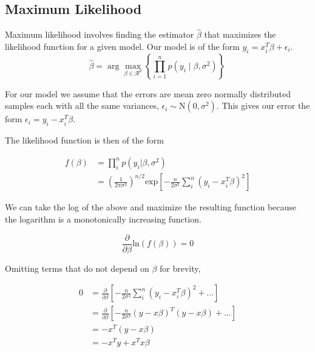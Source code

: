 \documentclass[12pt]{article}
\begin{document}
        \subsection*{Maximum Likelihood}

        Maximum likelihood involves finding the estimator $\hat{\beta}$ that maximizes the likelihood function for a given model. Our model is of the form $y_i = x_i^T \beta + \epsilon_i$.
        \begin{equation}
            \hat{\beta} = \arg \max_{\beta \in \mathcal{R}^p} \left\{ \prod_{i=1}^n p(y_i \mid \beta, \sigma^2) \right\} \,
        \end{equation}

        For our model we assume that the errors are mean zero normally distributed samples each with all the same variances, $\epsilon_i \sim \text{N}(0, \sigma^2)$. This gives our error the form $\epsilon_i = y_i - x_i^T \beta$. 

        The likelihood function is then of the form

        \begin{align}
            f(\beta) &= \prod_i^n p(y_i|\beta, \sigma^2) \\
             &= \left( \frac{1}{2 \pi \sigma^2}\right)^{n/2} \text{exp}\left [ -\frac{n}{2\sigma^2} \sum_i^n(y_i - x_i^T \beta)^2 \right]
        \end{align}

        We can take the log of the above and maximize the resulting function because the logarithm is a monotonically increasing function. 

        \begin{equation}
            \frac{\partial}{\partial \beta}\text{ln}(f(\beta)) = 0
        \end{equation}

        Omitting terms that do not depend on $\beta$ for brevity,

        \begin{align}
            0 & = \frac{\partial}{\partial \beta}\left [ - \frac{n}{2 \sigma^2}\sum_i^n(y_i - x_i^T \beta)^2 + ...\right] \\
            & = \frac{\partial}{\partial \beta}\left [ - \frac{n}{2 \sigma^2} (y - x\beta)^T(y-x\beta)+ ... \right ] \\
            & = -x^T (y-x\beta)\\
            & = -x^T y + x^T x \beta
        \end{align}
\end{document}
